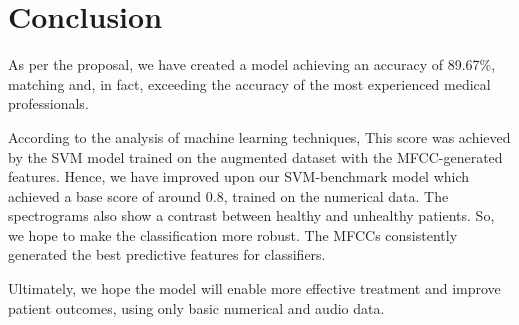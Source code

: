 \documentclass[10pt,twocolumn,letterpaper]{article}
\begin{document}
\section{Conclusion}

As per the proposal, we have created a model achieving an accuracy of 89.67\%, matching and, in fact, exceeding the accuracy of the most experienced medical professionals.

According to the analysis of machine learning techniques, This score was achieved by the SVM model trained on the augmented dataset with the MFCC-generated features.
Hence, we have improved upon our SVM-benchmark model which achieved a base score of around 0.8, trained on the numerical data. The spectrograms also show a contrast between healthy and unhealthy patients. So, we hope to make the classification more robust. The MFCCs consistently generated the best predictive features for classifiers.

Ultimately, we hope the model will enable more effective treatment and improve patient outcomes, using only basic numerical and audio data.

{\small


}
\end{document}
